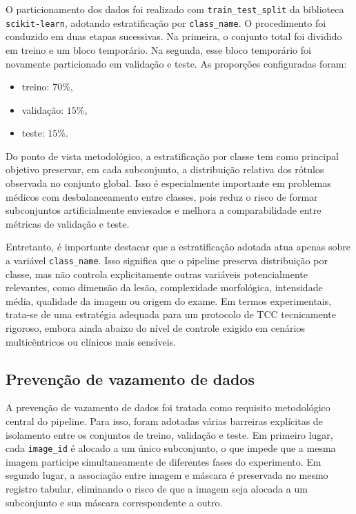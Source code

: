 \documentclass[tcc,capa]{texufpel}
\begin{document}
O particionamento dos dados foi realizado com \texttt{train\_test\_split} da biblioteca \texttt{scikit-learn}, adotando estratificação por \texttt{class\_name}. O procedimento foi conduzido em duas etapas sucessivas. Na primeira, o conjunto total foi dividido em treino e um bloco temporário. Na segunda, esse bloco temporário foi novamente particionado em validação e teste. As proporções configuradas foram:
\begin{itemize}
	\item treino: \(70\%\),
	\item validação: \(15\%\),
	\item teste: \(15\%\).
\end{itemize}

Do ponto de vista metodológico, a estratificação por classe tem como principal objetivo preservar, em cada subconjunto, a distribuição relativa dos rótulos observada no conjunto global. Isso é especialmente importante em problemas médicos com desbalanceamento entre classes, pois reduz o risco de formar subconjuntos artificialmente enviesados e melhora a comparabilidade entre métricas de validação e teste.

Entretanto, é importante destacar que a estratificação adotada atua apenas sobre a variável \texttt{class\_name}. Isso significa que o pipeline preserva distribuição por classe, mas não controla explicitamente outras variáveis potencialmente relevantes, como dimensão da lesão, complexidade morfológica, intensidade média, qualidade da imagem ou origem do exame. Em termos experimentais, trata-se de uma estratégia adequada para um protocolo de TCC tecnicamente rigoroso, embora ainda abaixo do nível de controle exigido em cenários multicêntricos ou clínicos mais sensíveis.

\subsection{Prevenção de vazamento de dados}

A prevenção de vazamento de dados foi tratada como requisito metodológico central do pipeline. Para isso, foram adotadas várias barreiras explícitas de isolamento entre os conjuntos de treino, validação e teste. Em primeiro lugar, cada \texttt{image\_id} é alocado a um único subconjunto, o que impede que a mesma imagem participe simultaneamente de diferentes fases do experimento. Em segundo lugar, a associação entre imagem e máscara é preservada no mesmo registro tabular, eliminando o risco de que a imagem seja alocada a um subconjunto e sua máscara correspondente a outro.
\end{document}
